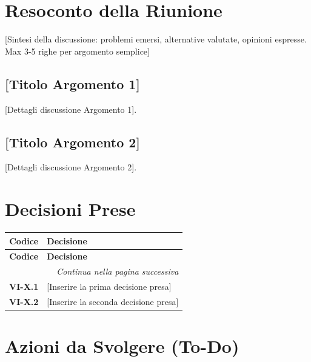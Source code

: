 \section{Resoconto della Riunione}
[Sintesi della discussione: problemi emersi, alternative valutate, opinioni espresse. Max 3-5 righe per argomento semplice]

\subsection{{[Titolo Argomento 1]}}
{[Dettagli discussione Argomento 1]}.

\subsection{{[Titolo Argomento 2]}}
{[Dettagli discussione Argomento 2]}.

\section{Decisioni Prese}

\renewcommand{\arraystretch}{1.3}
\vspace{-0.3cm}
\noindent
\begin{longtable}{c p{12cm}}
	\toprule
	\textbf{Codice} & \textbf{Decisione} \\
	\midrule
	\endfirsthead

	\toprule
	\textbf{Codice} & \textbf{Decisione} \\
	\midrule
	\endhead

	\midrule
	\multicolumn{2}{r}{\textit{Continua nella pagina successiva}} \\
	\midrule
	\endfoot

	\bottomrule
	\endlastfoot

	\textbf{VI-X.1} & {[Inserire la prima decisione presa]} \\[4pt]
	\textbf{VI-X.2} & {[Inserire la seconda decisione presa]} \\
\end{longtable}

\section{Azioni da Svolgere (To-Do)}

